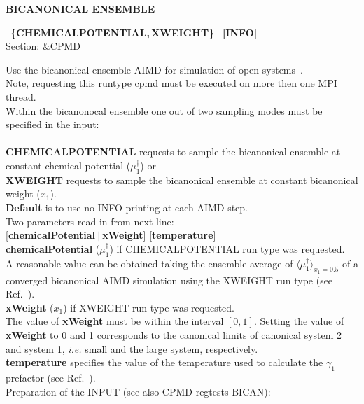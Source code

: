\documentclass[twoside,10pt,titlepage,a4paper]{article}
\newcommand{\reflabel}[1]{\hypertarget{#1}}
\newcommand{\reflabel}[1]{\label{#1}}
\newcommand{\keyword}[5]{%
\vspace{1.0cm}
\begin{minipage}{15cm}
\reflabel{#1}{\textbf{\large #1}}%
\index{#1}%
\ \textbf{#2}%
\ \textbf{#3}%
\ \textit{#4}%
     \hfill\\\smallskip
     {Section: #5}
     \hfill\\\smallskip\vskip 10pt
\end{minipage}
}%
\newcommand{\desc}[1]{%
   \hspace*{\fill} \parbox{130mm}{\sloppy
                          {#1}%
                             }
     \hfill\\\smallskip
   }%
\newcommand{\desc}[1]{#1\vspace{1ex}}
\begin{document}
\keyword{BICANONICAL ENSEMBLE}{\{CHEMICALPOTENTIAL,\,XWEIGHT\} }{[INFO]}{}{\&CPMD}
  \desc{Use the bicanonical ensemble AIMD for simulation of open
    systems~\cite{Frenzel2017}. 
    \\
    Note, requesting this runtype cpmd must be executed on more then one MPI
    thread.
    \\
    Within the bicanonocal ensemble one out of two sampling modes must be 
    specified in the input:\\
    \\[0.5em]
    \textbf{CHEMICALPOTENTIAL} requests to sample the bicanonical ensemble at
    constant chemical potential ($\mu^\dagger_1$) or 
    \\[0.25em]
    \textbf{XWEIGHT} requests to sample the bicanonical ensemble at constant
    bicanonical weight ($x_1$).
    \\[0.25em]
    \textbf{Default} is to use no INFO printing at each AIMD step. 
    \\[1em]
    Two parameters read in from next line: 
    \\[0.5em]
    [\textbf{chemicalPotential}$~|~$\textbf{xWeight}]  [\textbf{temperature}]
    \\[0.5em]
    \textbf{chemicalPotential} 
    ($\mu^\dagger_1$) if CHEMICALPOTENTIAL run type was requested. 
    \\[0.25em]
    A reasonable value can be obtained taking the ensemble average of $\langle
    \mu^\dagger_1 \rangle_{x_1=0.5}$ of a converged bicanonical AIMD simulation
    using the XWEIGHT run type (see Ref.~\cite{Frenzel2017}).
    \\[0.5em]
    \textbf{xWeight} ($x_1$) if XWEIGHT run type was requested. 
    \\[0.25em]
    The value of \textbf{xWeight} must be within the interval $[0,1]$. 
    Setting the value of \textbf{xWeight} to 0 and 1 corresponds to the
    canonical limits of canonical system 2 and system 1, \textit{i.e.\@} small
    and the large system, respectively.
    \\[0.5em]
    \textbf{temperature} specifies the value of the temperature used to calculate 
    the $\gamma_1$ prefactor (see Ref.~\cite{Frenzel2017}).
    \\[1em]
    Preparation of the INPUT (see also CPMD regtests BICAN):
    \\[0.25em]
}
\end{document}
